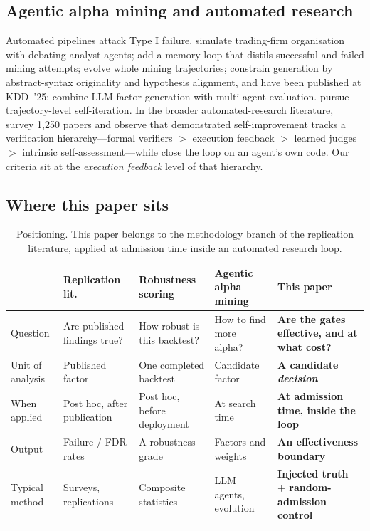 \documentclass[11pt]{article}
\begin{document}
\subsection{Agentic alpha mining and automated research}

Automated pipelines attack Type I failure. \citet{tradingagents} simulate trading-firm
organisation with debating analyst agents; \citet{factorMiner} add a memory loop that distils
successful and failed mining attempts; \citet{quantaalpha} evolve whole mining trajectories;
\citet{alphaagent} constrain generation by abstract-syntax originality and hypothesis alignment,
and have been published at KDD~'25; \citet{automate} combine LLM factor generation with
multi-agent evaluation. \citet{alphaseek} pursue trajectory-level self-iteration. In the broader
automated-research literature, \citet{rsisurvey} survey 1{,}250 papers and observe that
demonstrated self-improvement tracks a verification hierarchy---formal verifiers $>$ execution
feedback $>$ learned judges $>$ intrinsic self-assessment---while \citet{aide2} close the loop on
an agent's own code. Our criteria sit at the \emph{execution feedback} level of that hierarchy.

\subsection{Where this paper sits}
\label{sec:position}

\begin{table}[htbp]
\centering
\caption{Positioning. This paper belongs to the methodology branch of the replication
literature, applied at admission time inside an automated research loop.}
\label{tab:position}
\small
\begin{tabular}{@{}p{2.5cm}p{3.0cm}p{2.9cm}p{3.0cm}p{3.2cm}@{}}
\toprule
& \textbf{Replication lit.} & \textbf{Robustness scoring} & \textbf{Agentic alpha mining} & \textbf{This paper} \\
\midrule
Question & Are published findings true? & How robust is this backtest? & How to find more alpha? & \textbf{Are the gates effective, and at what cost?} \\
Unit of analysis & Published factor & One completed backtest & Candidate factor & \textbf{A candidate \emph{decision}} \\
When applied & Post hoc, after publication & Post hoc, before deployment & At search time & \textbf{At admission time, inside the loop} \\
Output & Failure / FDR rates & A robustness grade & Factors and weights & \textbf{An effectiveness boundary} \\
Typical method & Surveys, replications & Composite statistics & LLM agents, evolution & \textbf{Injected truth $+$ random-admission control} \\
\bottomrule
\end{tabular}
\end{table}
\end{document}
